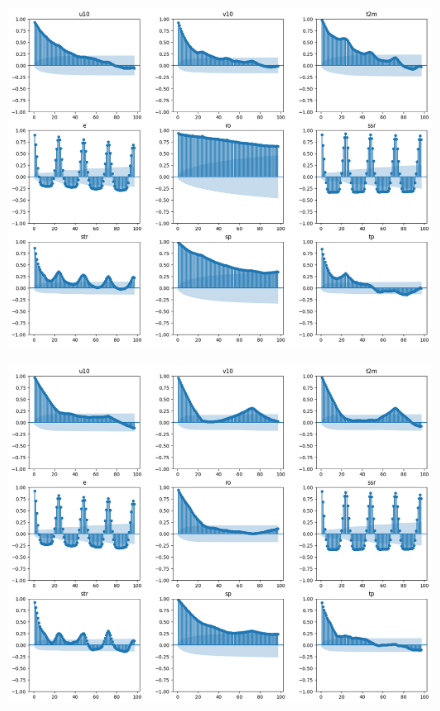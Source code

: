 \begin{figure}[H]
    \centering
    \includegraphics[width=\textwidth]{images/svr_autocorr.png}
    \caption{}
    \label{svr-autocorr}
\end{figure}

\begin{figure}[H]
    \centering
    \includegraphics[width=\textwidth]{images/dt_autocorr.png}
    \caption{}
    \label{dt-autocorr}
\end{figure}

